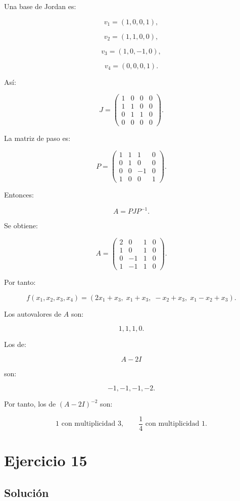 \documentclass[11pt,a4paper]{article}
\begin{document}
Una base de Jordan es:

\[
v_1=(1,0,0,1),
\]

\[
v_2=(1,1,0,0),
\]

\[
v_3=(1,0,-1,0),
\]

\[
v_4=(0,0,0,1).
\]

Así:

\[
\boxed{
J=
\begin{pmatrix}
1&0&0&0\\
1&1&0&0\\
0&1&1&0\\
0&0&0&0
\end{pmatrix}.
}
\]

La matriz de paso es:

\[
P=
\begin{pmatrix}
1&1&1&0\\
0&1&0&0\\
0&0&-1&0\\
1&0&0&1
\end{pmatrix}.
\]

Entonces:

\[
A=PJP^{-1}.
\]

Se obtiene:

\[
\boxed{
A=
\begin{pmatrix}
2&0&1&0\\
1&0&1&0\\
0&-1&1&0\\
1&-1&1&0
\end{pmatrix}.
}
\]

Por tanto:

\[
\boxed{
f(x_1,x_2,x_3,x_4)
=
(2x_1+x_3,\;
x_1+x_3,\;
-x_2+x_3,\;
x_1-x_2+x_3).
}
\]

Los autovalores de $A$ son:

\[
1,1,1,0.
\]

Los de:

\[
A-2I
\]

son:

\[
-1,-1,-1,-2.
\]

Por tanto, los de $(A-2I)^{-2}$ son:

\[
\boxed{
1\text{ con multiplicidad }3,
\qquad
\frac14\text{ con multiplicidad }1.
}
\]

\section{Ejercicio 15}
\subsection{Solución}
\end{document}
